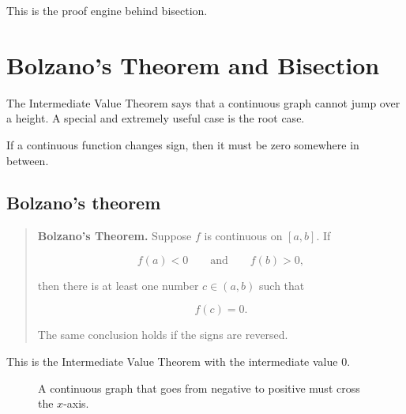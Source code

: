 This is the proof engine behind bisection.

\section{Bolzano's Theorem and Bisection}
\label{appsec:bolzano-bisection}

The Intermediate Value Theorem says that a continuous graph cannot jump over a
height.  A special and extremely useful case is the root case.

If a continuous function changes sign, then it must be zero somewhere in between.

\subsection{Bolzano's theorem}
\label{appsubsec:bolzano-theorem}

\begin{quote}
\textbf{Bolzano's Theorem.}
Suppose \(f\) is continuous on \([a,b]\).  If

\[
f(a)<0
\qquad\text{and}\qquad
f(b)>0,
\]

then there is at least one number \(c\in(a,b)\) such that

\[
f(c)=0.
\]

The same conclusion holds if the signs are reversed.
\end{quote}

This is the Intermediate Value Theorem with the intermediate value \(0\).

\begin{figure}[h]
\centering
{}
\caption{A continuous graph that goes from negative to positive must cross the \(x\)-axis.}
\label{fig:bolzano-crossing}
\end{figure}

